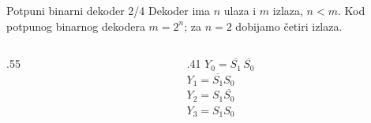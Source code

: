 \begin{frame}[label=03-s005]{Potpuni binarni dekoder 2/4}
Dekoder ima \(n\) ulaza i \(m\) izlaza, \(n<m\). Kod potpunog binarnog dekodera \(m=2^n\); za \(n=2\) dobijamo četiri izlaza.
\par\vspace{1mm}
\begin{columns}[c,onlytextwidth]
\begin{column}{.55\textwidth}\centering

\end{column}
\begin{column}{.41\textwidth}\centering
{}
\vspace{2mm}
\(Y_0=\overline{S_1}\,\overline{S_0}\)\\[2mm]
\(Y_1=\overline{S_1}S_0\)\\[2mm]
\(Y_2=S_1\overline{S_0}\)\\[2mm]
\(Y_3=S_1S_0\)
\end{column}
\end{columns}
\par\par\vspace{2mm}
\end{frame}
